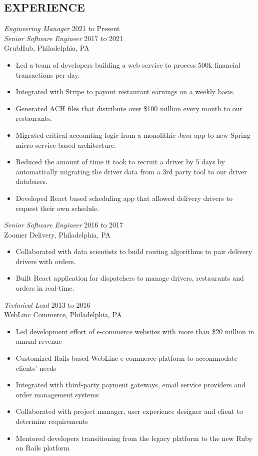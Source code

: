 \documentclass[line]{style}
\begin{document}
\newsectionwidth{0in}

\address{michaelcdalton@gmail.com}
\address{linkedin.com/in/michaelcdalton}

\begin{resume}

\section{EXPERIENCE}

{\sl Engineering Manager} \hfill 2021 to Present \\
{\sl Senior Software Engineer} \hfill 2017 to 2021 \\
GrubHub, Philadelphia, PA
\begin{itemize} \itemsep -2pt
\item Led a team of developers building a web service to process 500k financial transactions per day.
\item Integrated with Stripe to payout restaurant earnings on a weekly basis.
\item Generated ACH files that distribute over \$100 million every month to our restaurants.
\item Migrated critical accounting logic from a monolithic Java app to new Spring micro-service based architecture.
\item Reduced the amount of time it took to recruit a driver by 5 days by automatically migrating the driver data from a 3rd party tool to our driver databases.
\item Developed React based scheduling app that allowed delivery drivers to request their own schedule.
\end{itemize}

{\sl Senior Software Engineer} \hfill 2016 to 2017 \\
Zoomer Delivery, Philadelphia, PA
\begin{itemize} \itemsep -2pt
\item Collaborated with data scientists to build routing algorithms to pair delivery drivers with orders.
\item Built React application for dispatchers to manage drivers, restaurants and orders in real-time.
\end{itemize}

{\sl Technical Lead} \hfill 2013 to 2016 \\
WebLinc Commerce, Philadelphia, PA
\begin{itemize} \itemsep -2pt
\item Led development effort of e-commerce websites with more than \$20 million in annual revenue
\item Customized Rails-based WebLinc e-commerce platform to accommodate clients' needs
\item Integrated with third-party payment gateways, email service providers and order management systems
\item Collaborated with project manager, user experience designer and client to determine requirements
\item Mentored developers transitioning from the legacy platform to the new Ruby on Rails platform
\end{itemize}


\end{resume}
\end{document}
